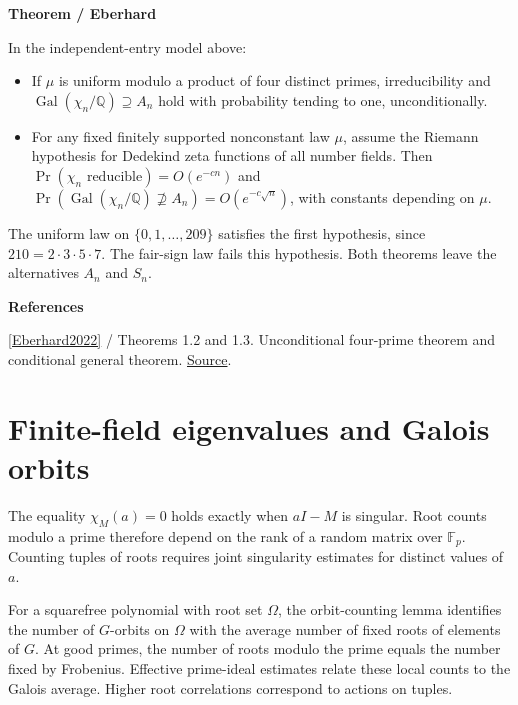 \documentclass[11pt,a4paper,oneside,openany]{book}
\newenvironment{sources}{\par\smallskip\begingroup\footnotesize\color{atlasgray}\leftskip=10pt\setlength{\parskip}{2pt}}{\par\endgroup\smallskip}
\begin{document}
\begin{atlasblock}[standard]
\textbf{\sffamily Theorem  /  Eberhard}\par\smallskip
\color{black} In the independent-entry model above:\par

\begin{itemize}
\item\leavevmode\color{black} If \(\mu\) is uniform modulo a product of four distinct primes, irreducibility and \(\operatorname{Gal}(\chi_n/\mathbb Q)\supseteq A_n\) hold with probability tending to one, unconditionally.
\item\leavevmode\color{black} For any fixed finitely supported nonconstant law \(\mu\), assume the Riemann hypothesis for Dedekind zeta functions of all number fields. Then \(\Pr(\chi_n\text{ reducible})=O(e^{-cn})\) and \(\Pr(\operatorname{Gal}(\chi_n/\mathbb Q)\not\supseteq A_n)=O(e^{-c\sqrt n})\), with constants depending on \(\mu\).
\end{itemize}
\end{atlasblock}\color{black}
\color{black} The uniform law on \(\{0,1,\ldots,209\}\) satisfies the first hypothesis, since \(210=2\cdot3\cdot5\cdot7\). The fair-sign law fails this hypothesis. Both theorems leave the alternatives \(A_n\) and \(S_n\).\par
\begin{sources}
\textbf{References}\par\smallskip
\noindent\hyperlink{ref:Eberhard2022}{[Eberhard2022]} / Theorems 1.2 and 1.3. Unconditional four-prime theorem and conditional general theorem. \href{https://arxiv.org/abs/2008.01223}{Source}.\par
\end{sources}\color{black}
\section{Finite-field eigenvalues and Galois orbits}
\color{black} The equality \(\chi_M(a)=0\) holds exactly when \(aI-M\) is singular. Root counts modulo a prime therefore depend on the rank of a random matrix over \(\mathbb F_p\). Counting tuples of roots requires joint singularity estimates for distinct values of \(a\).\par
\color{black} For a squarefree polynomial with root set \(\Omega\), the orbit-counting lemma identifies the number of \(G\)-orbits on \(\Omega\) with the average number of fixed roots of elements of \(G\). At good primes, the number of roots modulo the prime equals the number fixed by Frobenius. Effective prime-ideal estimates relate these local counts to the Galois average. Higher root correlations correspond to actions on tuples.\par
\end{document}
